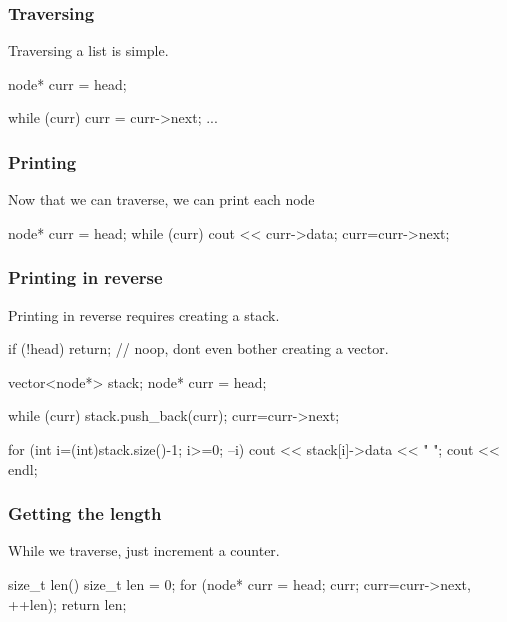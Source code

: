 \documentclass{report}
\begin{document}
    \pagebreak 
    \subsubsection{Traversing}
    \bigbreak \noindent 
    Traversing a list is simple.
    \bigbreak \noindent 
    \begin{cppcode}
    node* curr = head;

    while (curr) {
        curr = curr->next;
        ...
    }
    \end{cppcode}

    \pagebreak 
    \subsubsection{Printing}
    \bigbreak \noindent 
    Now that we can traverse, we can print each node
    \bigbreak \noindent 
    \begin{cppcode}
    node* curr = head;
    while (curr) {
        cout << curr->data;
        curr=curr->next;
    }
    \end{cppcode}

    \pagebreak 
    \subsubsection{Printing in reverse}
    \bigbreak \noindent 
    Printing in reverse requires creating a stack.
    \bigbreak \noindent 
    \begin{cppcode}
    if (!head) return; // noop, dont even bother creating a vector.

    vector<node*> stack;
    node* curr = head;

    while (curr) {
        stack.push_back(curr);
        curr=curr->next;
    }

    for (int i=(int)stack.size()-1; i>=0; --i) {
        cout << stack[i]->data << " ";
    }
    cout << endl;
    \end{cppcode}

    \pagebreak 
    \subsubsection{Getting the length}
    \bigbreak \noindent 
    While we traverse, just increment a counter.
    \bigbreak \noindent 
    \begin{cppcode}
        size_t len() {
            size_t len = 0;
            for (node* curr = head; curr; curr=curr->next, ++len);
            return len;
        }
    \end{cppcode}
\end{document}
